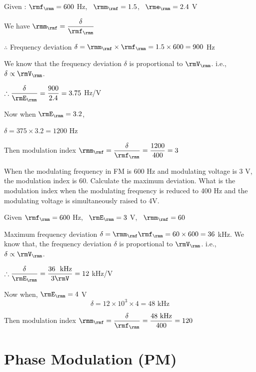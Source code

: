 \begin{solution}
Given : $\rmf_\rmm = 600$ Hz, ~$\rmm_\rmf = 1.5$, ~$\rme_\rmm = 2.4$ V

\smallskip
We have $\rmm_\rmf = \dfrac{\delta}{\rmf_\rmm}$

\smallskip
$\therefore$ Frequency deviation $\delta = \rmm_\rmf \times \rmf_\rmm = 1.5 \times
600 = 900$ Hz

\smallskip
We know that the frequency deviation $\delta$ is proportional to
$\rmV_\rmm$. i.e., ~~$\delta \propto \rmV_\rmm$.

\smallskip
$\therefore \dfrac{\delta}{\rmE_\rmm}= \dfrac{900}{2.4} = 3.75 $  Hz/V

\smallskip
Now when $\rmE_\rmm = 3.2$,

\smallskip
$\delta = 375 \times 3.2 = 1200$ Hz

\smallskip
Then modulation index $\rmm_\rmf = \dfrac{\delta}{\rmf_\rmm}
= \dfrac{1200}{400} = 3$
\end{solution}

\begin{problem}\label{prob8.24}
When the modulating frequency in FM is 600 Hz and modulating voltage
is 3 V, the modulation index is 60. Calculate the maximum
deviation. What is the modulation index when the modulating frequency
is reduced to 400 Hz and the modulating voltage is simultaneously
raised to 4V.
\end{problem}

\begin{solution}
Given $\rmf_\rmm = 600$ Hz, ~$\rmE_\rmm = 3$ V, ~$\rmm_\rmf =60$

\smallskip
Maximum frequency deviation $\delta = \rmm_\rmf \rmf_\rmm= 60 \times 600 = 36$
kHz. We know that, the frequency deviation $\delta$ is proportional to
$\rmV_\rmm$. i.e., $\delta \propto \rmV_\rmm$.

\smallskip
$\therefore \dfrac{\delta}{\rmE_\rmm} = \dfrac{36~ \text{ kHz}}{3\rmV}
= 12$ kHz/V

\smallskip
Now when, $\rmE_\rmm = 4$ V
$$
\delta = 12 \times 10^3 \times 4 = 48 \text{ kHz}
$$

\smallskip
Then modulation index $\rmm_\rmf = \dfrac{\delta}{\rmf_\rmm} = \dfrac{48~\text{kHz}}{400} = 120$
\end{solution}

\section{Phase Modulation (PM)}\label{sec8.9}

